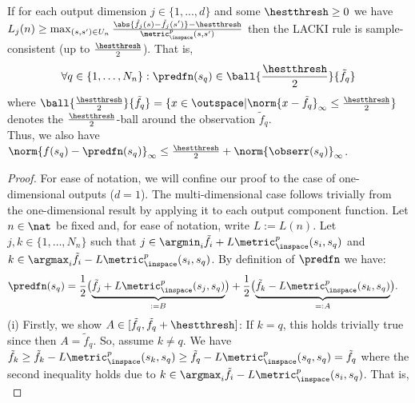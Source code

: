 \begin{lem} \label{lem:LACKIsampleconsistency} If for each output dimension $j \in \{1,...,d\}$ and some $\hestthresh \geq 0$ we have $L_j(n)  \geq  \max_{(s,s') \in U_n} \frac{\abs{\tilde f_j(s)- \tilde f_j(s')} -\hestthresh }{\metric_\inspace^p(s,s')}
$ then the LACKI rule is sample-consistent (up to $\frac \hestthresh 2$). 
That is,  \[\forall q \in \{1,\ldots,N_n \}:  \predfn(s_q) \in \ball{\frac \hestthresh 2}{\tilde f_q} \] where $\ball{\frac \hestthresh 2}{\tilde f_q} =\{ x \in \outspace |  \norm{x-\tilde f_q}_\infty \leq \frac \hestthresh 2\}$ denotes the $\frac \hestthresh 2$-ball around the observation $\tilde f_q$.\\
Thus, we also have $\norm{ f(s_q) - \predfn(s_q)}_\infty \leq \frac \hestthresh 2 + \norm{\obserr(s_q)}_\infty$.
\begin{proof}
For ease of notation, we will confine our proof to the case of one-dimensional outputs ($d=1$). The multi-dimensional case follows trivially from the one-dimensional result by applying it to each output component function. 
Let $n \in \nat  $ be fixed and, for ease of notation, write $L := L(n)$. Let $j,k \in   \{1,\ldots,N_n \} $ such that $j \in \argmin_i \tilde f_i + L \metric_\inspace^p(s_i,s_q) $ and 
$k \in \argmax_i \tilde f_i - L \metric_\inspace^p(s_i,s_q) $. 
By definition of $\predfn$ we have:
\begin{align}
\predfn(s_q) 
&= \frac 1 2 \bigl(\underbrace{ \tilde f_j + L \metric_\inspace^p(s_j,s_q)}_{:=B}   \bigr) + \frac 1 2 \bigl( \underbrace{\tilde  f_k - L \metric_\inspace^p(s_k,s_q) }_{=:A}\bigr). \label{eq:hru582jsokbbbn}
\end{align}
%
%
(i) Firstly, we show  \underline{$ A \in [\tilde f_q, \tilde f_q +\hestthresh]$}:
If $k = q$, this holds trivially true since then $A= \tilde f_q$. 
So, assume $k \neq q$. 
We have $\tilde f_k \geq \tilde f_k - L \metric_\inspace^p(s_k,s_q)  \geq \tilde f_q - L \metric_\inspace^p(s_q,s_q)  = \tilde f_q$ where the second inequality holds due to $k \in \argmax_i \tilde f_i - L \metric_\inspace^p(s_i,s_q) $. That is,
\begin{equation} 

\end{equation}
\end{proof}
\end{lem}
